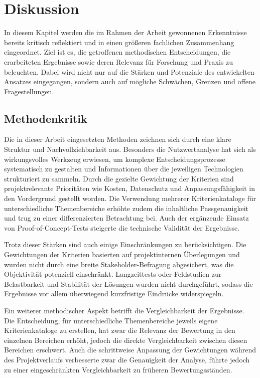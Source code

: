 \chapter{Diskussion}
\label{chap:diskussion}

  In diesem Kapitel werden die im Rahmen der Arbeit gewonnenen Erkenntnisse bereits kritisch reflektiert und in einen größeren fachlichen Zusammenhang eingeordnet.
  Ziel ist es, die getroffenen methodischen Entscheidungen, die erarbeiteten Ergebnisse sowie deren Relevanz für Forschung und Praxis zu beleuchten.
  Dabei wird nicht nur auf die Stärken und Potenziale des entwickelten Ansatzes eingegangen, sondern auch auf mögliche Schwächen, Grenzen und offene Fragestellungen.

  \section{Methodenkritik}

    Die in dieser Arbeit eingesetzten Methoden zeichnen sich durch eine klare Struktur und Nachvollziehbarkeit aus.
    Besonders die Nutzwertanalyse hat sich als wirkungsvolles Werkzeug erwiesen, um komplexe Entscheidungsprozesse systematisch zu gestalten und Informationen über die jeweiligen Technologien strukturiert zu sammeln.
    Durch die gezielte Gewichtung der Kriterien sind projektrelevante Prioritäten wie Kosten, Datenschutz und Anpassungsfähigkeit in den Vordergrund gestellt worden.
    Die Verwendung mehrerer Kriterienkataloge für unterschiedliche Themenbereiche erhöhte zudem die inhaltliche Passgenauigkeit und trug zu einer differenzierten Betrachtung bei.
    Auch der ergänzende Einsatz von Proof-of-Concept-Tests steigerte die technische Validität der Ergebnisse.

    Trotz dieser Stärken sind auch einige Einschränkungen zu berücksichtigen.
    Die Gewichtungen der Kriterien basierten auf projektinternen Überlegungen und wurden nicht durch eine breite Stakeholder-Befragung abgesichert, was die Objektivität potenziell einschränkt.
    Langzeittests oder Feldstudien zur Belastbarkeit und Stabilität der Lösungen wurden nicht durchgeführt, sodass die Ergebnisse vor allem überwiegend kurzfristige Eindrücke widerspiegeln.

    Ein weiterer methodischer Aspekt betrifft die Vergleichbarkeit der Ergebnisse.
    Die Entscheidung, für unterschiedliche Themenbereiche jeweils eigene Kriterienkataloge zu erstellen, hat zwar die Relevanz der Bewertung in den einzelnen Bereichen erhöht, jedoch die direkte Vergleichbarkeit zwischen diesen Bereichen erschwert.
    Auch die schrittweise Anpassung der Gewichtungen während des Projektverlaufs verbesserte zwar die Genauigkeit der Analyse, führte jedoch zu einer eingeschränkten Vergleichbarkeit zu früheren Bewertungsständen.

